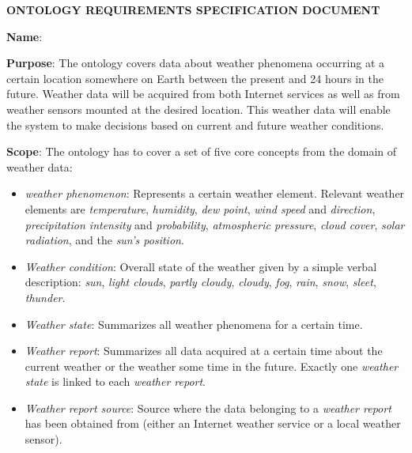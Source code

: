 \vspace{1em}

\begin{mdframed}[linewidth=.6pt]
\setlength{\parindent}{0pt}
\vspace{.4cm}

\MakeUppercase{\textbf{Ontology Requirements Specification Document}}

\vspace{.6cm}

\textbf{Name}: \thinkhomeweather

\vspace{.3cm}

\textbf{Purpose}: The ontology covers data about weather phenomena occurring at a certain location somewhere on Earth between the present and 24 hours in the future. Weather data will be acquired from both Internet services as well as from weather sensors mounted at the desired location. This weather data will enable the \thinkhome system to make decisions based on current and future weather conditions.

\vspace{.3cm}

\textbf{Scope}: The ontology has to cover a set of five core concepts from the domain of weather data:

\begin{itemize}
  \item \emph{weather phenomenon}: Represents a certain weather element. Relevant weather elements are \emph{temperature}, \emph{humidity}, \emph{dew point}, \emph{wind speed} and \emph{direction}, \emph{precipitation intensity} and \emph{probability}, \emph{atmospheric pressure}, \emph{cloud cover}, \emph{solar radiation}, and the \emph{sun's position}.
  \item \emph{Weather condition}: Overall state of the weather given by a simple verbal description: \emph{sun}, \emph{light clouds}, \emph{partly cloudy}, \emph{cloudy}, \emph{fog}, \emph{rain}, \emph{snow}, \emph{sleet}, \emph{thunder}.
  \item \emph{Weather state}: Summarizes all weather phenomena for a certain time. 
  \item \emph{Weather report}: Summarizes all data acquired at a certain time about the current weather or the weather some time in the future. Exactly one \emph{weather state} is linked to each \emph{weather report}.
  \item \emph{Weather report source}: Source where the data belonging to a \emph{weather report} has been obtained from (either an Internet weather service or a local weather sensor).
\end{itemize}


\end{mdframed}
